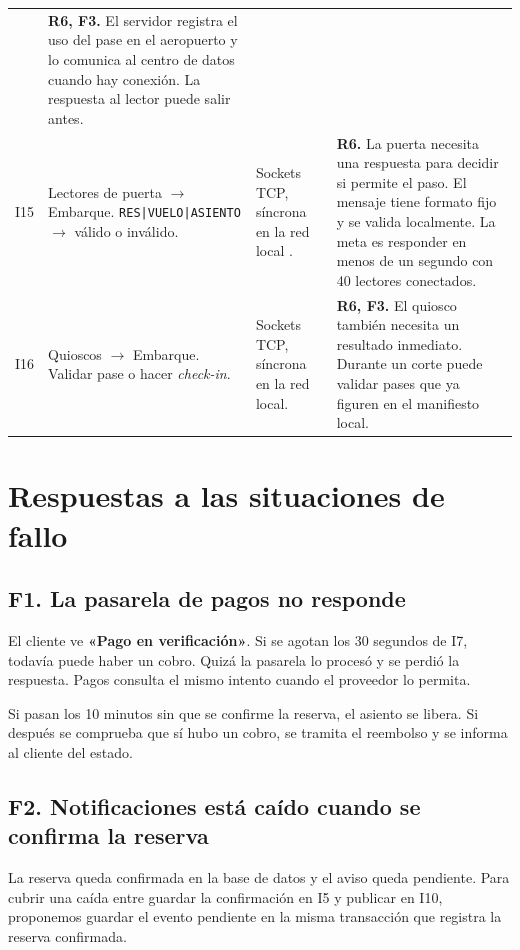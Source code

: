 \documentclass[11pt,a4paper]{article}
\newcommand{\flecha}{\(\to\)}
\begin{document}
{\begin{longtable}{@{}P{0.75cm}P{4.25cm}P{4.1cm}P{7.2cm}@{}}
& \textbf{R6, F3.} El servidor registra el uso del pase en el aeropuerto y lo comunica al centro de datos cuando hay conexión. La respuesta al lector puede salir antes. \\
\addlinespace
I15 & Lectores de puerta \flecha{} Embarque. \texttt{RES|VUELO|ASIENTO} \flecha{} válido o inválido.
& Sockets TCP, síncrona en la red local \cite[sec. 2.2]{tcp}.
& \textbf{R6.} La puerta necesita una respuesta para decidir si permite el paso. El mensaje tiene formato fijo y se valida localmente. La meta es responder en menos de un segundo con 40 lectores conectados. \\
\addlinespace
I16 & Quioscos \flecha{} Embarque. Validar pase o hacer \textit{check-in}.
& Sockets TCP, síncrona en la red local.
& \textbf{R6, F3.} El quiosco también necesita un resultado inmediato. Durante un corte puede validar pases que ya figuren en el manifiesto local. \\
\end{longtable}
}

\clearpage
\section*{Respuestas a las situaciones de fallo}

\subsection*{F1. La pasarela de pagos no responde}

El cliente ve \textbf{«Pago en verificación»}. Si se agotan los 30 segundos de I7, todavía puede haber un cobro. Quizá la pasarela lo procesó y se perdió la respuesta. Pagos consulta el mismo intento cuando el proveedor lo permita.

Si pasan los 10 minutos sin que se confirme la reserva, el asiento se libera. Si después se comprueba que sí hubo un cobro, se tramita el reembolso y se informa al cliente del estado.

\subsection*{F2. Notificaciones está caído cuando se confirma la reserva}

La reserva queda confirmada en la base de datos y el aviso queda pendiente. Para cubrir una caída entre guardar la confirmación en I5 y publicar en I10, proponemos guardar el evento pendiente en la misma transacción que registra la reserva confirmada.
\end{document}

